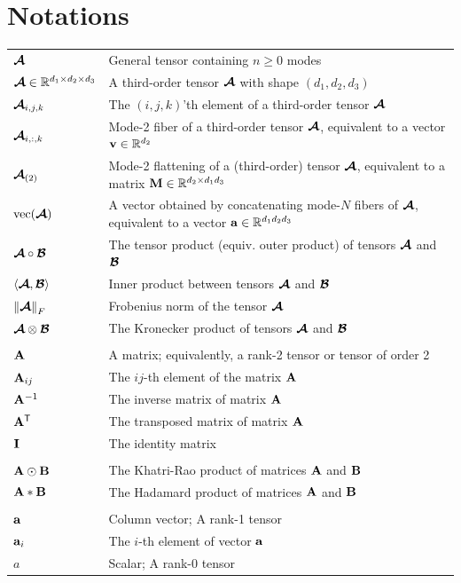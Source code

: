\section*{Notations}


    \begin{tabular}{ll}
        $\bm{\mathcal{A}}$ & General tensor containing $n \geq 0$ modes \\
        $\bm{\mathcal{A}}\in \mathbb{R}^{d_1 \times d_2 \times d_3}$ & A third-order tensor $\bm{\mathcal{A}}$ with shape $(d_1, d_2, d_3)$ \\
        $\bm{\mathcal{A}}_{i,j,k}$ & The $(i,j,k)$'th element of a third-order tensor $\bm{\mathcal{A}}$ \\
        $\bm{\mathcal{A}}_{i,:,k}$ & Mode-2 fiber of a third-order tensor $\mathbf{\boldsymbol{\mathcal{A}}}$, equivalent to a vector $\mathbf{v}\in \mathbb{R}^{d_2}$ \\
        $\bm{\mathcal{A}}_{(2)}$ & Mode-2 flattening of a (third-order) tensor $\bm{\mathcal{A}}$, equivalent to a matrix $\mathbf{M}\in \mathbb{R}^{d_2 \times d_1 d_3}$ \\
        $\mathrm{vec}(\bm{\mathcal{A}})$ & A vector obtained by concatenating mode-$N$ fibers of $\bm{\mathcal{A}}$, equivalent to a vector $\mathbf{a}\in\mathbb{R}^{d_1d_2d_3}$\\
        $\bm{\mathcal{A}}\circ \bm{\mathcal{B}}$ & The tensor product (equiv. outer product) of tensors $\bm{\mathcal{A}}$ and $\bm{\mathcal{B}}$ \\
         $\left\langle \bm{\mathcal{A}},\bm{\mathcal{B}} \right\rangle$ & Inner product between tensors $\bm{\mathcal{A}}$ and $\bm{\mathcal{B}}$\\
         $\left\lVert\bm{\mathcal{A}}\right\rVert_F$  &  Frobenius norm of the tensor $\bm{\mathcal{A}}$\\
         $\bm{\mathcal{A}}\otimes\bm{\mathcal{B}}$ & The Kronecker product of tensors $\bm{\mathcal{A}}$ and $\bm{\mathcal{B}}$\\
         \\
         $\mathbf{A}$ & A matrix; equivalently, a rank-2 tensor or tensor of order 2\\
         $\mathbf{A}_{ij}$ & The $ij$-th element of the matrix $\mathbf{A}$\\
         $\mathbf{A}^{-1}$ & The inverse matrix of matrix $\mathbf{A}$\\
         $\mathbf{A}^{\mathsf{T}}$ & The transposed matrix of matrix $\mathbf{A}$\\
         $\mathbf{I}$ & The identity matrix\\
         \\
         $\mathbf{A}\odot\mathbf{B}$ & The Khatri-Rao product of matrices $\mathbf{A}$ and $\mathbf{B}$\\
         $\mathbf{A}*\mathbf{B}$ & The Hadamard product of matrices $\mathbf{A}$ and $\mathbf{B}$ \\ 
         \\
         $\mathbf{a}$ & Column vector; A rank-1 tensor\\
         $\mathbf{a}_{i}$ & The $i$-th element of vector $\mathbf{a}$ \\
         $a$ & Scalar; A rank-0 tensor\\
         
         
\end{tabular}
 \newpage
